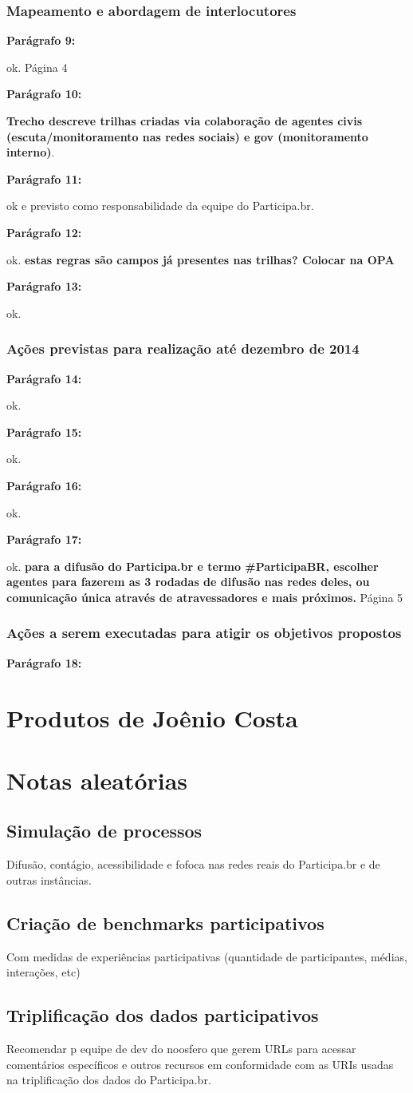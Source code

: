 \documentclass[12pt]{report}
\newcommand{\pp}[1]{

\textbf{Parágrafo #1:}

}
\begin{document}
\section{Mapeamento e abordagem de interlocutores}
\pp{9} ok.
\noindent Página 4
\pp{10} {\bf \color{red} Trecho descreve trilhas criadas via colaboração de agentes civis (escuta/monitoramento nas redes sociais) e gov (monitoramento interno)}.
\pp{11} ok e previsto como responsabilidade da equipe do Participa.br.
\pp{12} ok. {\bf \color{red} estas regras são campos já presentes nas trilhas? Colocar na OPA}
\pp{13} ok.
\section{Ações previstas para realização até dezembro de 2014}
\pp{14} ok.
\pp{15} ok.
\pp{16} ok.
\pp{17} ok. {\bf \color{red} para a difusão do Participa.br e termo \#ParticipaBR, escolher agentes para fazerem as 3 rodadas de difusão nas redes deles, ou comunicação única através de atravessadores e mais próximos.}
\noindent Página 5
\section{Ações a serem executadas para atigir os objetivos propostos}
\pp{18}




\part{Produtos de Joênio Costa}

\part{Notas aleatórias}

\chapter{Simulação de processos}

Difusão, contágio, acessibilidade e fofoca nas redes reais do Participa.br e de outras instâncias.

\chapter{Criação de benchmarks participativos}
Com medidas de experiências participativas (quantidade de participantes, médias, interações, etc)

\chapter{Triplificação dos dados participativos}
Recomendar p equipe de dev do noosfero que gerem URLs para acessar comentários específicos e outros recursos em conformidade com as URIs usadas na triplificação dos dados do Participa.br.
\end{document}
